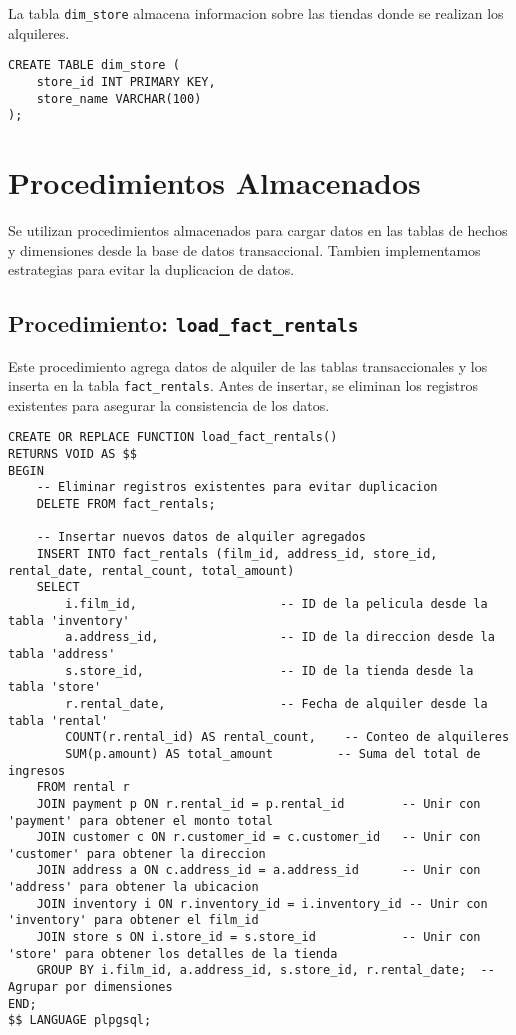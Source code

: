 \documentclass{article}
\begin{document}
La tabla \texttt{dim\_store} almacena informacion sobre las tiendas donde se realizan los alquileres.

\begin{lstlisting}
CREATE TABLE dim_store (
    store_id INT PRIMARY KEY,
    store_name VARCHAR(100)
);
\end{lstlisting}

\newpage
\section{Procedimientos Almacenados}

Se utilizan procedimientos almacenados para cargar datos en las tablas de hechos y dimensiones desde la base de datos transaccional. Tambien implementamos estrategias para evitar la duplicacion de datos.

\subsection{Procedimiento: \texttt{load\_fact\_rentals}}

Este procedimiento agrega datos de alquiler de las tablas transaccionales y los inserta en la tabla \texttt{fact\_rentals}. Antes de insertar, se eliminan los registros existentes para asegurar la consistencia de los datos.

\begin{lstlisting}
CREATE OR REPLACE FUNCTION load_fact_rentals()
RETURNS VOID AS $$
BEGIN
    -- Eliminar registros existentes para evitar duplicacion
    DELETE FROM fact_rentals;

    -- Insertar nuevos datos de alquiler agregados
    INSERT INTO fact_rentals (film_id, address_id, store_id, rental_date, rental_count, total_amount)
    SELECT 
        i.film_id,                    -- ID de la pelicula desde la tabla 'inventory'
        a.address_id,                 -- ID de la direccion desde la tabla 'address'
        s.store_id,                   -- ID de la tienda desde la tabla 'store'
        r.rental_date,                -- Fecha de alquiler desde la tabla 'rental'
        COUNT(r.rental_id) AS rental_count,    -- Conteo de alquileres
        SUM(p.amount) AS total_amount         -- Suma del total de ingresos
    FROM rental r
    JOIN payment p ON r.rental_id = p.rental_id        -- Unir con 'payment' para obtener el monto total
    JOIN customer c ON r.customer_id = c.customer_id   -- Unir con 'customer' para obtener la direccion
    JOIN address a ON c.address_id = a.address_id      -- Unir con 'address' para obtener la ubicacion
    JOIN inventory i ON r.inventory_id = i.inventory_id -- Unir con 'inventory' para obtener el film_id
    JOIN store s ON i.store_id = s.store_id            -- Unir con 'store' para obtener los detalles de la tienda
    GROUP BY i.film_id, a.address_id, s.store_id, r.rental_date;  -- Agrupar por dimensiones
END;
$$ LANGUAGE plpgsql;
\end{lstlisting}
\end{document}
